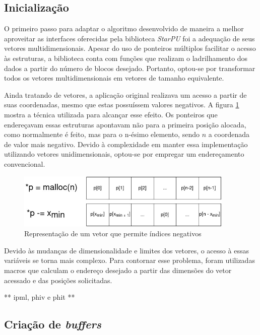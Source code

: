 \documentclass[cic,tc]{iiufrgs}
\begin{document}
\subsection{Inicialização}

O primeiro passo para adaptar o algoritmo desenvolvido de maneira a melhor aproveitar as interfaces oferecidas pela biblioteca \textit{StarPU} foi a adequação de seus vetores multidimensionais. Apesar
do uso de ponteiros múltiplos facilitar o acesso às estruturas, a biblioteca conta com funções que realizam o ladrilhamento dos dados a partir do número de blocos desejado. Portanto, optou-se por
transformar todos os vetores multidimensionais em vetores de tamanho equivalente.

Ainda tratando de vetores, a aplicação original realizava um acesso a partir de suas coordenadas, mesmo que estas possuíssem valores negativos. A figura \ref{fig:negative_index} mostra a
técnica utilizada para alcançar esse efeito. Os ponteiros que endereçavam essas estruturas apontavam não para a primeira posição alocada, como normalmente é feito, mas para o n-ésimo elemento,
sendo $n$ a coordenada de valor mais negativo. Devido à complexidade em manter essa implementação utilizando vetores unidimensionais, optou-se por empregar um endereçamento convencional.

\begin{figure}[!htb]
    \caption{Representação de um vetor que permite índices negativos}
    \begin{center}
      \includegraphics[width=28em]{negative_index}
    \end{center}
    \label{fig:negative_index}
\end{figure}

Devido às mudanças de dimensionalidade e limites dos vetores, o acesso à essas variáveis se torna mais complexo. Para contornar esse problema, foram utilizadas macros que calculam o endereço
desejado a partir das dimensões do vetor acessado e das posições solicitadas.

** ipml, phiv e phit **

\subsection{Criação de \textit{buffers}}
\end{document}
